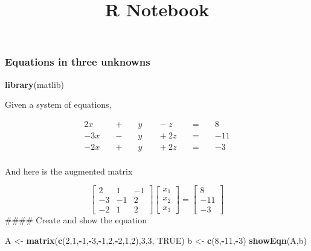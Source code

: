 \documentclass[
]{article}
\title{R Notebook}
\author{}
\date{\vspace{-2.5em}}
\newenvironment{Shaded}{\begin{snugshade}}{\end{snugshade}}
\newcommand{\DecValTok}[1]{\textcolor[rgb]{0.00,0.00,0.81}{#1}}
\newcommand{\KeywordTok}[1]{\textcolor[rgb]{0.13,0.29,0.53}{\textbf{#1}}}
\newcommand{\NormalTok}[1]{#1}
\newcommand{\OperatorTok}[1]{\textcolor[rgb]{0.81,0.36,0.00}{\textbf{#1}}}
\newcommand{\OtherTok}[1]{\textcolor[rgb]{0.56,0.35,0.01}{#1}}
\newcommand{\StringTok}[1]{\textcolor[rgb]{0.31,0.60,0.02}{#1}}
\begin{document}
\maketitle

\hypertarget{equations-in-three-unknowns}{%
\subsubsection{Equations in three
unknowns}\label{equations-in-three-unknowns}}

\begin{Shaded}
\begin{Highlighting}[]
\KeywordTok{library}\NormalTok{(matlib)}
\end{Highlighting}
\end{Shaded}

Given a system of equations,

\[
\begin{alignat*}{7}
2x &&\; + \;&& y  &&\; -z &&\; = \;&& 8  \\
-3x &&\; - \;&& y &&\; +2z  &&\; = \;&& -11 \\
-2x &&\; + \;&& y &&\; +2z &&\; = \;&& -3
\end{alignat*}
\]\\
And here is the augmented matrix

\[
\begin{bmatrix}
    2 & 1 & -1 \\
  -3 & -1 & 2 \\
  -2 & 1 & 2
  \end{bmatrix}
    \begin{bmatrix}
      x_{1} \\
    x_{2} \\
    x_{3}
\end{bmatrix}
    =
    \begin{bmatrix}
    8 \\
    -11\\
    -3
    \end{bmatrix}
\] \#\#\#\# Create and show the equation

\begin{Shaded}
\begin{Highlighting}[]
\NormalTok{A <-}\StringTok{ }\KeywordTok{matrix}\NormalTok{(}\KeywordTok{c}\NormalTok{(}\DecValTok{2}\NormalTok{,}\DecValTok{1}\NormalTok{,}\OperatorTok{-}\DecValTok{1}\NormalTok{,}\OperatorTok{-}\DecValTok{3}\NormalTok{,}\OperatorTok{-}\DecValTok{1}\NormalTok{,}\DecValTok{2}\NormalTok{,}\OperatorTok{-}\DecValTok{2}\NormalTok{,}\DecValTok{1}\NormalTok{,}\DecValTok{2}\NormalTok{),}\DecValTok{3}\NormalTok{,}\DecValTok{3}\NormalTok{, }\OtherTok{TRUE}\NormalTok{)}
\NormalTok{b <-}\StringTok{ }\KeywordTok{c}\NormalTok{(}\DecValTok{8}\NormalTok{,}\OperatorTok{-}\DecValTok{11}\NormalTok{,}\OperatorTok{-}\DecValTok{3}\NormalTok{)}
\KeywordTok{showEqn}\NormalTok{(A,b)}
\end{Highlighting}
\end{Shaded}
\end{document}
